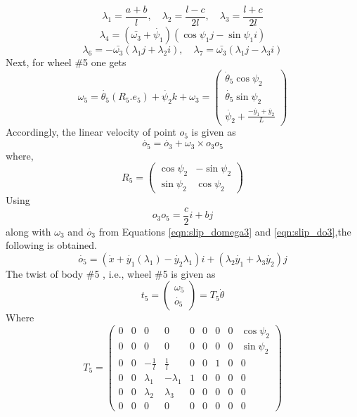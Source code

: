 \[\lambda_1=\frac{a+b}{l}, \quad \lambda_2=\frac{l-c}{2l}, \quad \lambda_3=\frac{l+c}{2l} \]
  \[\lambda_4=(\bar{\omega_3}+\dot{\psi_1}) (\cos\psi_1 j-\sin \psi_1 i) \]
  \[\lambda_6=-\bar{\omega_3}(\lambda_1 j+\lambda_2 i), \quad \lambda_7=\bar{\omega_3}(\lambda_1 j-\lambda_3 i)\]
Next, for wheel \#5  one gets 
\[\omega_5 = \dot{\theta_5} (R_5.e_5) + \dot{\psi_2} k + \omega_3 =
  \left(
\begin{array}{c}
\dot{\theta }_5 \cos \psi_2 \\
\dot{\theta_5} \sin \psi_2 \\
\dot{\psi_2}+\frac{-\dot{y_1}+\dot{y_2}}{L}
\end{array}
\right) \]
Accordingly, the linear velocity of point $o_5$ is given as 
\[ \dot{o_5}=\dot{o_3}+\omega_3 \times o_3o_5\]
where, \begin{equation}
\label{eqn:slipR5}
R_5=\begin{pmatrix}
\cos \psi_2 & - \sin \psi_2\\
\sin \psi_2 & \cos\psi_2
\end{pmatrix}
\end{equation}
Using  \[ o_3o_5=\frac{c}{2}i+bj\] along with $\omega_3$ and $\dot{o_3}$ from Equations \ref{eqn:slip_domega3} and  \ref{eqn:slip_do3},the following is obtained.
\[\dot{o_5}= \left( \dot{x}+\dot{y_1}(\lambda_1)-\dot{y_2}\lambda_1 \right)i +\left( \lambda_2\dot{y_1}+\lambda_3\dot{y_2}\right)j  \]
The twist of body \#5 , i.e., wheel \#5 is given as 
\begin{equation}
\label{eqn:slip_t5}
t_5=
\begin{pmatrix}
\omega_5\\
\dot{o_5}
\end{pmatrix}=T_5 \dot{\theta}
\end{equation}
Where
\begin{equation}
\label{eqn:slip_T5}
T_5=\left(
\begin{array}{ccccccccc}
0 & 0 & 0 & 0 & 0 & 0 & 0 & 0 & \cos \psi_2\\
0 & 0 & 0 & 0 & 0 & 0 & 0 & 0 & \sin\psi_2 \\
0 & 0 & -\frac{1}{l} & \frac{1}{l} & 0 & 0 & 1 & 0 & 0 \\
0 & 0 & \lambda_1 & -\lambda_1 & 1 & 0 & 0 & 0 & 0 \\
0 & 0 &\lambda_2& \lambda_3 & 0 & 0 & 0 & 0 & 0 \\
0 & 0 & 0 & 0 & 0 & 0 & 0 & 0 & 0
\end{array}
\right)
\end{equation}

